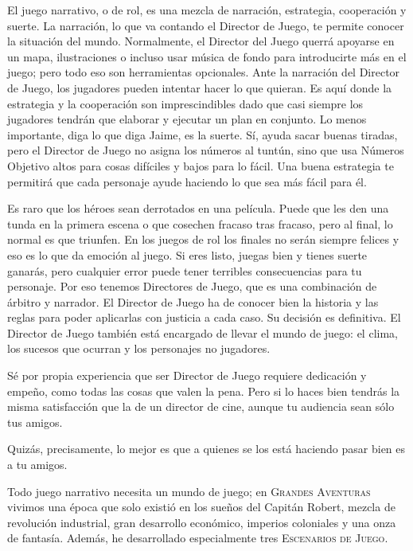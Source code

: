 El juego narrativo, o de rol, es una mezcla de narración, estrategia, cooperación y suerte. La narración, lo que va contando el Director de Juego, te permite conocer la situación del mundo. Normalmente, el Director del Juego querrá apoyarse en un mapa, ilustraciones o incluso usar música de fondo para introducirte más en el juego; pero todo eso son herramientas opcionales. Ante la narración del Director de Juego, los jugadores pueden intentar hacer lo que quieran. Es aquí donde la estrategia y la cooperación son imprescindibles dado que casi siempre los jugadores tendrán que elaborar y ejecutar un plan en conjunto. Lo menos importante, diga lo que diga Jaime, es la suerte. Sí, ayuda sacar buenas tiradas, pero el Director de Juego no asigna los números al tuntún, sino que usa Números Objetivo altos para cosas difíciles y bajos para lo fácil. Una buena estrategia te permitirá que cada personaje ayude haciendo lo que sea más fácil para él.

Es raro que los héroes sean derrotados en una película. Puede que les den una tunda en la primera escena o que cosechen fracaso tras fracaso, pero al final, lo normal es que triunfen. En los juegos de rol los finales no serán siempre felices y eso es lo que da emoción al juego. Si eres listo, juegas bien y tienes suerte ganarás, pero cualquier error puede tener terribles consecuencias para tu personaje.
Por eso tenemos Directores de Juego, que es una combinación de árbitro y narrador. El Director de Juego ha de conocer bien la historia y las reglas para poder aplicarlas con justicia a cada caso. Su decisión es definitiva. El Director de Juego también está encargado de llevar el mundo de juego: el clima, los sucesos que ocurran y los personajes no jugadores.

Sé por propia experiencia que ser Director de Juego requiere dedicación y empeño, como todas las cosas que valen la pena. Pero si lo haces bien tendrás la misma satisfacción que la de un director de cine, aunque tu audiencia sean sólo tus amigos.

Quizás, precisamente, lo mejor es que a quienes se los está haciendo pasar bien es a tu amigos.


Todo juego narrativo necesita un mundo de juego; en \textsc{Grandes Aventuras} vivimos una época que solo existió en los sueños del Capitán Robert, mezcla de revolución industrial, gran desarrollo económico, imperios coloniales y una onza de fantasía. Además, he desarrollado especialmente tres \textsc{Escenarios de Juego}. 

